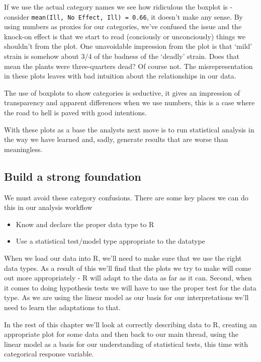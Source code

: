 \documentclass[
]{book}
\providecommand{\tightlist}{%
  \setlength{\itemsep}{0pt}\setlength{\parskip}{0pt}}
\begin{document}
If we use the actual category names we see how ridiculous the boxplot is - consider \texttt{mean(Ill,\ No\ Effect,\ Ill)\ =\ 0.66}, it doesn't make any sense. By using numbers as proxies for our categories, we've confused the issue and the knock-on effect is that we start to read (conciously or unconciously) things we shouldn't from the plot. One unavoidable impression from the plot is that `mild' strain is somehow about 3/4 of the badness of the `deadly' strain. Does that mean the plants were three-quarters dead? Of course not. The misrepresentation in these plots leaves with bad intuition about the relationships in our data.

The use of boxplots to show categories is seductive, it gives an impression of transparency and apparent differences when we use numbers, this is a case where the road to hell is paved with good intentions.

With these plots as a base the analysts next move is to run statistical analysis in the way we have learned and, sadly, generate results that are worse than meaningless.

\hypertarget{build-a-strong-foundation}{%
\subsection{Build a strong foundation}\label{build-a-strong-foundation}}

We must avoid these category confusions. There are some key places we can do this in our analysis workflow

\begin{itemize}
\tightlist
\item
  Know and declare the proper data type to R
\item
  Use a statistical test/model type appropriate to the datatype
\end{itemize}

When we load our data into R, we'll need to make sure that we use the right data types. As a result of this we'll find that the plots we try to make will come out more appropriately - R will adapt to the data as far as it can. Second, when it comes to doing hypothesis tests we will have to use the proper test for the data type. As we are using the linear model as our basis for our interpretations we'll need to learn the adaptations to that.

In the rest of this chapter we'll look at correctly describing data to R, creating an appropriate plot for some data and then back to our main thread, using the linear model as a basis for our understanding of statistical tests, this time with categorical response variable.
\end{document}
